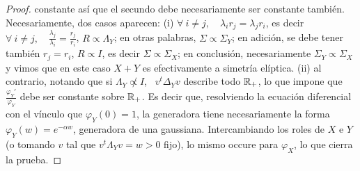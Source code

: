 \begin{proof}
  constante   as\'i   que  el   secundo   debe   necesariamente  ser   constante
  tambi\'en. Necesariamente, dos casos aparecen:  (i) $\forall \: i \ne j, \quad
  \lambda_i  r_j  =  \lambda_j  r_i$,  es  decir $\forall  \:  i  \ne  j,  \quad
  \frac{\lambda_j}{\lambda_i} = \frac{r_j}{r_i}$,  \ie $R \propto \Lambda_Y$; en
  otras  palabras,  $\Sigma  \propto  \Sigma_Y$;  en adici\'on,  se  debe  tener
  tambi\'en $r_j = r_i$, \ie $R  \propto I$, es decir $\Sigma \propto \Sigma_X$;
  en  conclusi\'on, necesariamente $\Sigma_Y  \propto \Sigma_X$  y vimos  que en
  este caso $X+Y$ es efectivamente  a simetr\'ia el\'iptica.  (ii) al contrario,
  notando que  si $\Lambda_Y  \not\propto I$, \  $v^t \Delta_Y v$  describe todo
  $\mathbb{R}_+$, lo que impone que $\frac{\varphi_Y'}{\varphi_Y}$ debe ser constante
  sobre $\mathbb{R}_+$.  Es  decir que, resolviendo la ecuaci\'on  diferencial con el
  v\'inculo que $\varphi_Y(0) = 1$,  la generadora tiene necesariamente la forma
  $\varphi_Y(w) =  e^{-\alpha w}$, generadora de  una gaussiana.  Intercambiando
  los roles de $X$ e $Y$ (o tomando $v$ tal que $v^t \Lambda_Y v = w > 0$ fijo),
  lo mismo occure para $\varphi_X$, lo que cierra la prueba.
\end{proof}

